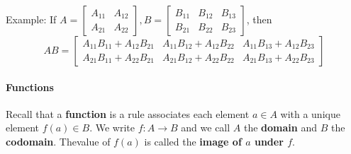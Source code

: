 \documentclass[10pt,letter]{article}
\begin{document}
Example: If $A = \begin{bmatrix}A_{11}&A_{12}\\A_{21}&A_{22}\end{bmatrix}, B=\begin{bmatrix}B_{11}&B_{12}&B_{13}\\B_{21}&B_{22}&B_{23}\end{bmatrix}$, then $$AB=\begin{bmatrix}A_{11}B_{11}+A_{12}B_{21}&A_{11}B_{12}+A_{12}B_{22}&A_{11}B_{13}+A_{12}B_{23} \\ A_{21}B_{11}+A_{22}B_{21}&A_{21}B_{12}+A_{22}B_{22}&A_{21}B_{13}+A_{22}B_{23}\end{bmatrix}$$

\paragraph{Functions} Recall that a \textbf{function} is a rule associates each element $a\in A$ with a unique element $f(a)\in B$. We write $f:A\rightarrow B$ and we call $A$ the \textbf{domain} and $B$ the \textbf{codomain}. Thevalue of $f(a)$ is called the \textbf{image of $a$ under $f$}. 
\end{document}
